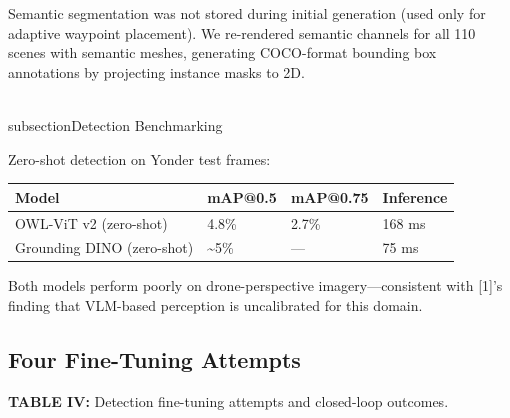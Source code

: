 \documentclass[conference]{IEEEtran}
\begin{document}
Semantic segmentation was not stored during initial generation (used
only for adaptive waypoint placement). We re-rendered semantic channels
for all 110 scenes with semantic meshes, generating COCO-format bounding
box annotations by projecting instance masks to 2D.

\\subsection{Detection Benchmarking}\label{b.-detection-benchmarking}

Zero-shot detection on Yonder test frames:

{\def\LTcaptype{none} %
\begin{longtable}[]{@{}llll@{}}
\toprule\noalign{}
Model & mAP@0.5 & mAP@0.75 & Inference \\
\midrule\noalign{}
\endhead
\bottomrule\noalign{}
\endlastfoot
OWL-ViT v2 (zero-shot) & 4.8\% & 2.7\% & 168 ms \\
Grounding DINO (zero-shot) & \textasciitilde5\% & --- & 75 ms \\
\end{longtable}
}

Both models perform poorly on drone-perspective imagery---consistent
with [1]'s finding that VLM-based perception is uncalibrated for
this domain.

\subsection{Four Fine-Tuning Attempts}\label{c.-four-fine-tuning-attempts}

\textbf{TABLE IV:} Detection fine-tuning attempts and closed-loop
outcomes.
\end{document}
